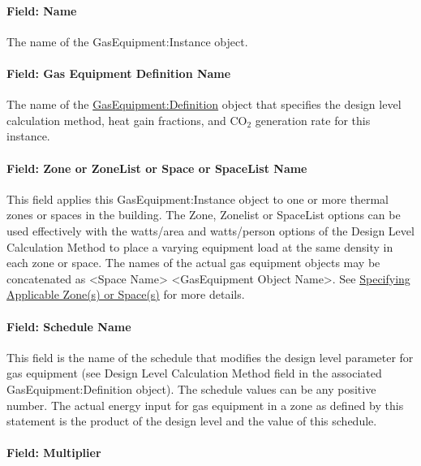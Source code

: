 \paragraph{Field: Name}\label{field-name-4-014-gas-instance}

The name of the GasEquipment:Instance object.

\paragraph{Field: Gas Equipment Definition Name}\label{field-gas-equipment-definition-name}

The name of the \hyperref[gasequipmentdefinition]{GasEquipment:Definition} object that specifies the design level calculation method, heat gain fractions, and CO\(_{2}\) generation rate for this instance.

\paragraph{Field: Zone or ZoneList or Space or SpaceList Name}\label{gaseq-field-zone-or-zonelist-name-000-gas-instance}

This field applies this GasEquipment:Instance object to one or more thermal zones or spaces in the building. The Zone, Zonelist or SpaceList options can be used effectively with the watts/area and watts/person options of the Design Level Calculation Method to place a varying equipment load at the same density in each zone or space. The names of the actual gas equipment objects may be concatenated as \textless{}Space Name\textgreater{} \textless{}GasEquipment Object Name\textgreater{}. See \hyperref[specifying-applicable-zones-or-spaces]{Specifying Applicable Zone(s) or Space(s)} for more details.

\paragraph{Field: Schedule Name}\label{field-schedule-name-2-001-gas-instance}

This field is the name of the schedule that modifies the design level parameter for gas equipment (see Design Level Calculation Method field in the associated GasEquipment:Definition object). The schedule values can be any positive number. The actual energy input for gas equipment in a zone as defined by this statement is the product of the design level and the value of this schedule.

\paragraph{Field: Multiplier}\label{field-multiplier-gasequipmentinstance}

